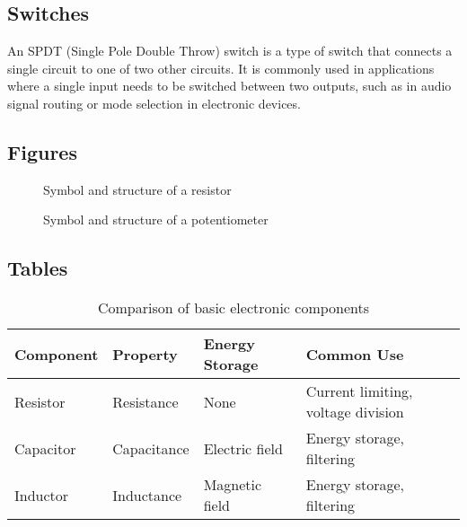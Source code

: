 \subsection*{Switches}
An SPDT (Single Pole Double Throw) switch is a type of switch that connects a single circuit to one of two other circuits. It is commonly used in applications where a single input needs to be switched between two outputs, such as in audio signal routing or mode selection in electronic devices.

\subsection*{Figures}
\begin{figure}[h!]
    \centering
    \caption{Symbol and structure of a resistor}
    \label{fig:resistor}
\end{figure}

\begin{figure}[h!]
    \centering
    \caption{Symbol and structure of a potentiometer}
    \label{fig:potentiometer}
\end{figure}

\subsection*{Tables}
\begin{table}[h!]
    \centering
    \caption{Comparison of basic electronic components}
    \label{tab:basic_components}
    \begin{tabular}{|l|l|l|l|}
        \hline
        \textbf{Component} & \textbf{Property} & \textbf{Energy Storage} & \textbf{Common Use} \\
        \hline
        Resistor & Resistance & None & Current limiting, voltage division \\
        Capacitor & Capacitance & Electric field & Energy storage, filtering \\
        Inductor & Inductance & Magnetic field & Energy storage, filtering \\
        \hline
    \end{tabular}
\end{table}

